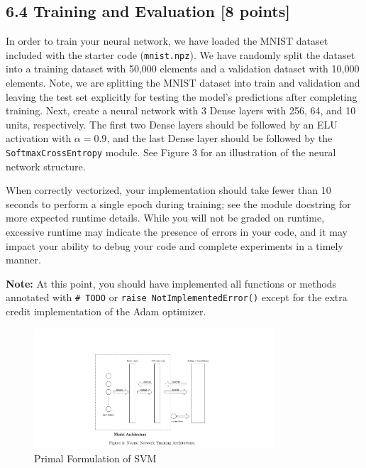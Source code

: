 \documentclass[a3paper,12pt]{extarticle} %
\begin{document}
\subsection*{6.4 Training and Evaluation [8 points]}
In order to train your neural network, we have loaded the MNIST dataset included with the starter code (\texttt{mnist.npz}). We have randomly split the dataset into a training dataset with 50,000 elements and a validation dataset with 10,000 elements. Note, we are splitting the MNIST dataset into train and validation and leaving the test set explicitly for testing the model's predictions after completing training. Next, create a neural network with 3 Dense layers with 256, 64, and 10 units, respectively. The first two Dense layers should be followed by an ELU activation with $\alpha = 0.9$, and the last Dense layer should be followed by the \texttt{SoftmaxCrossEntropy} module. See Figure 3 for an illustration of the neural network structure.

When correctly vectorized, your implementation should take fewer than 10 seconds to perform a single epoch during training; see the module docstring for more expected runtime details. While you will not be graded on runtime, excessive runtime may indicate the presence of errors in your code, and it may impact your ability to debug your code and complete experiments in a timely manner.

\textbf{Note:} At this point, you should have implemented all functions or methods annotated with \texttt{\# TODO} or \texttt{raise NotImplementedError()} except for the extra credit implementation of the Adam optimizer.

\begin{figure}[h]
    \centering
    \includegraphics[width=0.8\textwidth]{model.png}
    \caption{Primal Formulation of SVM}
    \label{fig:primal}
\end{figure}
\end{document}
